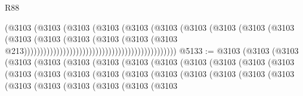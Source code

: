 \begin{lexlean}{R88}
\begin{coremodule}
                                                                  (@3103
                                                                    (@3103
                                                                      (@3103
                                                                        (@3103
                                                                          (@3103
                                                                            (@3103
                                                                              (@3103
                                                                                (@3103
                                                                                  (@3103
                                                                                    (@3103
                                                                                      (@3103
                                                                                        (@3103
                                                                                          (@3103
                                                                                            (@3103
                                                                                              (@3103
                                                                                                (@3103
                                                                                                  @213)))))))))))))))))))))))))))))))))))))))))))))))
@5133 := @3103
    (@3103
      (@3103
        (@3103
          (@3103
            (@3103
              (@3103
                (@3103
                  (@3103
                    (@3103
                      (@3103
                        (@3103
                          (@3103
                            (@3103
                              (@3103
                                (@3103
                                  (@3103
                                    (@3103
                                      (@3103
                                        (@3103
                                          (@3103
                                            (@3103
                                              (@3103
                                                (@3103
                                                  (@3103
                                                    (@3103
                                                      (@3103
                                                        (@3103
                                                          (@3103

\end{coremodule}
\end{lexlean}

